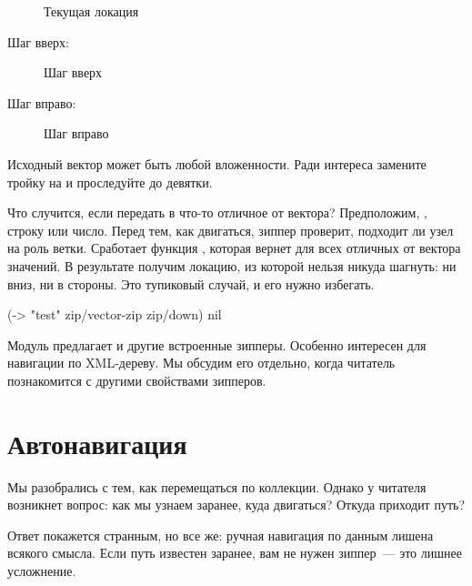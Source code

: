 \begin{figure}[ht!]
  \centering
  \caption{Текущая локация}
  \label{fig:chart-zip-09}
\end{figure}

Шаг вверх:

\begin{figure}[ht!]
  \centering
  \caption{Шаг вверх}
  \label{fig:chart-zip-10}
\end{figure}

Шаг вправо:

\begin{figure}[ht!]
  \centering
  \caption{Шаг вправо}
  \label{fig:chart-zip-11}
\end{figure}

Исходный вектор может быть любой вложенности. Ради интереса замените тройку на
 и проследуйте до девятки.

Что случится, если передать в  что-то отличное от вектора?
Предположим, , строку или число. Перед тем, как двигаться, зиппер проверит,
подходит ли узел на роль ветки. Сработает функция , которая вернет
 для всех отличных от вектора значений. В результате получим локацию, из
которой нельзя никуда шагнуть: ни вниз, ни в стороны. Это тупиковый случай, и
его нужно избегать.

\begin{english}
  \begin{clojure}
(-> "test"
    zip/vector-zip
    zip/down)
nil
  \end{clojure}
\end{english}

Модуль  предлагает и другие встроенные зипперы. Особенно интересен
 для навигации по XML-дереву. Мы обсудим его отдельно, когда читатель
познакомится с другими свойствами зипперов.

\section{Автонавигация}

Мы разобрались с тем, как перемещаться по коллекции. Однако у читателя возникнет
вопрос: как мы узнаем заранее, куда двигаться? Откуда приходит путь?

Ответ покажется странным, но все же: ручная навигация по данным лишена всякого
смысла. Если путь известен заранее, вам не нужен зиппер~--- это лишнее
усложнение.

